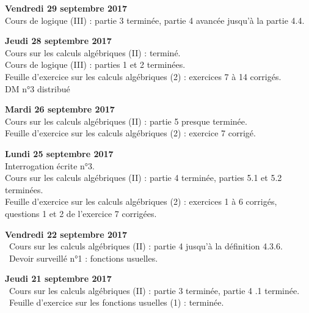 \documentclass[12pt,a4paper]{article}
\begin{document}
\noindent\textbf{Vendredi 29 septembre 2017}\\
\bu{} Cours de logique (III) : partie 3 terminée, partie 4 avancée jusqu'à la partie 4.4. \\
\vspace{.4cm}

\noindent\textbf{Jeudi 28 septembre 2017}\\
\bu{} Cours sur les calculs algébriques (II) : terminé. \\
\bu{} Cours de logique (III) : parties 1 et 2 terminées. \\
\bu{} Feuille d'exercice sur les calculs algébriques (2) : exercices 7 à 14 corrigés.  \\
\bu{} DM n°3 distribué\\
\vspace{.4cm}

\noindent\textbf{Mardi 26 septembre 2017}\\
\bu{} Cours sur les calculs algébriques (II) : partie 5 presque terminée. \\
\bu{} Feuille d'exercice sur les calculs algébriques (2) : exercice 7 corrigé.  \\
\vspace{.4cm}

\noindent\textbf{Lundi 25 septembre 2017}\\
\bu{} Interrogation écrite n°3.\\
\bu{} Cours sur les calculs algébriques (II) : partie 4 terminée, parties 5.1 et 5.2 terminées. \\
\bu{} Feuille d'exercice sur les calculs algébriques (2) : exercices 1 à 6 corrigés, questions 1 et 2 de l'exercice 7 corrigées.  \\
\vspace{.4cm}

\noindent\textbf{Vendredi 22 septembre 2017}\\
\bu\ Cours sur les calculs algébriques (II) : partie 4 jusqu'à la définition 4.3.6. \\
\bu\ Devoir surveillé n°1 : fonctions usuelles. \\
\vspace{.4cm}

\noindent\textbf{Jeudi 21 septembre 2017}\\
\bu\ Cours sur les calculs algébriques (II) : partie 3 terminée, partie 4 .1 terminée. \\
\bu\ Feuille d'exercice sur les fonctions usuelles (1) : terminée. \\
\vspace{.4cm}
\end{document}
